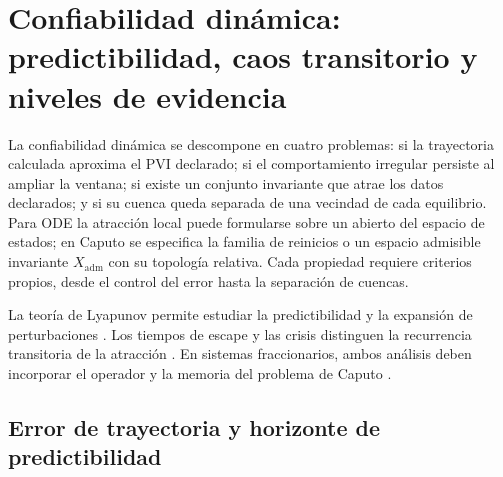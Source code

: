 \section[Confiabilidad dinámica y niveles de evidencia]
{Confiabilidad dinámica: predictibilidad, caos transitorio y
\mbox{niveles} de evidencia}
\label{sec:confiabilidad-dinamica}

\HAFOCardReliability

La confiabilidad dinámica se descompone en cuatro problemas: si la trayectoria
calculada aproxima el PVI declarado; si el comportamiento irregular persiste al ampliar
la ventana; si existe un conjunto invariante que atrae los datos declarados; y
si su cuenca queda separada de una vecindad de cada equilibrio. Para ODE la
atracción local puede formularse sobre un abierto del espacio de estados; en
Caputo se especifica la familia de reinicios o un espacio admisible invariante
\(X_{\mathrm{adm}}\) con su topología relativa. Cada propiedad requiere criterios propios, desde el control del error hasta
la separación de cuencas.

La teoría de Lyapunov permite estudiar la predictibilidad y la expansión de
perturbaciones \cite{VallejoSanjuan2017Predictability,DatserisParlitz2022Nonlinear}.
Los tiempos de escape y las crisis distinguen la recurrencia transitoria de
la atracción \cite{Ott2002Chaos,TelGruiz2006Chaotic}. En sistemas
fraccionarios, ambos análisis deben incorporar el operador y la memoria del
problema de Caputo \cite{SunHeWang2022FractionalChaos,Sabatier2021InfiniteMemory}.

\subsection{Error de trayectoria y horizonte de predictibilidad}

